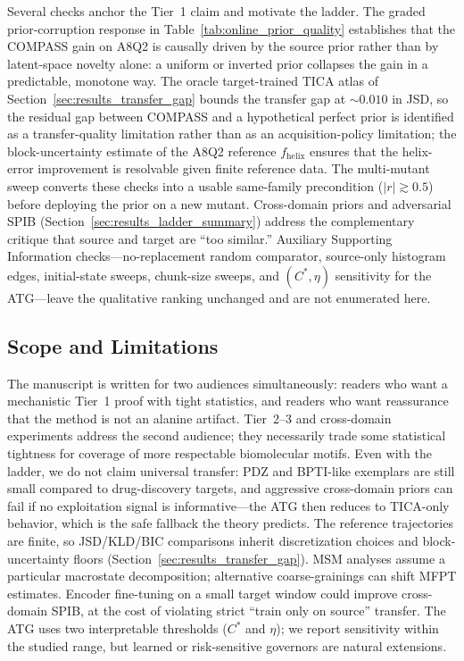 \documentclass[journal=jctcce,manuscript=article,layout=twocolumn]{achemso}
\begin{document}
Several checks anchor the Tier~1 claim and motivate the ladder. The graded prior-corruption response in Table~\ref{tab:online_prior_quality} establishes that the COMPASS gain on A8Q2 is causally driven by the source prior rather than by latent-space novelty alone: a uniform or inverted prior collapses the gain in a predictable, monotone way. The oracle target-trained TICA atlas of Section~\ref{sec:results_transfer_gap} bounds the transfer gap at $\sim 0.010$ in JSD, so the residual gap between COMPASS and a hypothetical perfect prior is identified as a transfer-quality limitation rather than as an acquisition-policy limitation; the block-uncertainty estimate of the A8Q2 reference $f_{\mathrm{helix}}$ ensures that the helix-error improvement is resolvable given finite reference data. The multi-mutant sweep converts these checks into a usable same-family precondition ($|r|\gtrsim 0.5$) before deploying the prior on a new mutant. Cross-domain priors and adversarial SPIB (Section~\ref{sec:results_ladder_summary}) address the complementary critique that source and target are ``too similar.'' Auxiliary Supporting Information checks---no-replacement random comparator, source-only histogram edges, initial-state sweeps, chunk-size sweeps, and $(C^*,\eta)$ sensitivity for the ATG---leave the qualitative ranking unchanged and are not enumerated here.

\subsection{Scope and Limitations}

The manuscript is written for two audiences simultaneously: readers who want a mechanistic Tier~1 proof with tight statistics, and readers who want reassurance that the method is not an alanine artifact. Tier~2--3 and cross-domain experiments address the second audience; they necessarily trade some statistical tightness for coverage of more respectable biomolecular motifs. Even with the ladder, we do not claim universal transfer: PDZ and BPTI-like exemplars are still small compared to drug-discovery targets, and aggressive cross-domain priors can fail if no exploitation signal is informative---the ATG then reduces to TICA-only behavior, which is the safe fallback the theory predicts. The reference trajectories are finite, so JSD/KLD/BIC comparisons inherit discretization choices and block-uncertainty floors (Section~\ref{sec:results_transfer_gap}). MSM analyses assume a particular macrostate decomposition; alternative coarse-grainings can shift MFPT estimates. Encoder fine-tuning on a small target window could improve cross-domain SPIB, at the cost of violating strict ``train only on source'' transfer. The ATG uses two interpretable thresholds ($C^*$ and $\eta$); we report sensitivity within the studied range, but learned or risk-sensitive governors are natural extensions.
\end{document}
